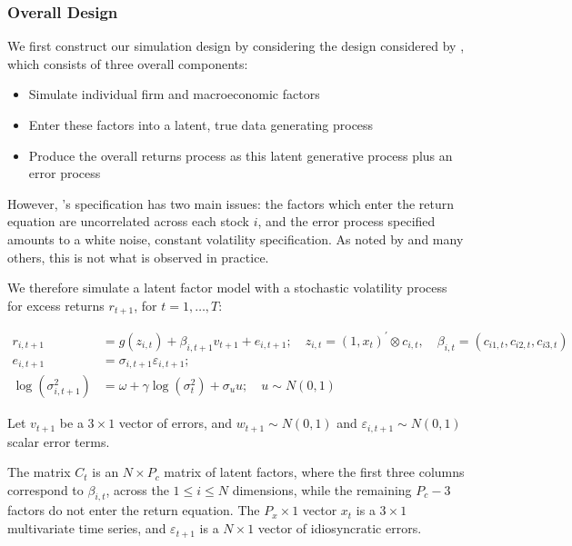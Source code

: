 \documentclass{article}
\begin{document}
\subsubsection{Overall Design}

We first construct our simulation design by considering the design considered by \cite{gu_empirical_2018}, which consists of three overall components:
\begin{itemize}
	\item Simulate individual firm and macroeconomic factors
	\item Enter these factors into a latent, true data generating process
	\item Produce the overall returns process as this latent generative process plus an error process
\end{itemize}

However, \cite{gu_empirical_2018}'s specification has two main issues: the factors which enter the return equation are uncorrelated across each stock $i$, and the error process specified amounts to a white noise, constant volatility specification. As noted by \cite{harvey__2016} and many others, this is not what is observed in practice. 

We therefore simulate a latent factor model with a stochastic volatility process for excess returns  $r_{t+1}$, for $t=1,\dots,T$:

\begin{align}
r_{i, t+1} &= 
g\left(z_{i, t}\right) + \beta_{i,t+1}v_{t+1} + e_{i, t+1}; 
\quad z_{i, t}=\left(1, x_{t}\right)^{\prime} \otimes c_{i, t}, 
\quad \beta_{i, t}=\left(c_{i 1, t}, c_{i 2, t}, c_{i 3, t}\right) \\ 
e_{i, t+1} &= 
\sigma_{i, t+1} \varepsilon_{i, t+1}; \\
\operatorname{log} (\sigma^2_{i,t+1}) &= 
\omega + \gamma \operatorname{log} (\sigma^2_{t}) + \sigma_{u}u; 
\quad u \sim N(0, 1)
\end{align}

Let $v_{t+1}$ be a $3\times 1$ vector of errors, and $w_{t+1} \sim N(0, 1)$ and $\varepsilon_{i,t+1} \sim N(0, 1)$ scalar error terms. 

The matrix $C_t$ is an $N\times P_c$ matrix of latent factors, where the first three columns correspond to $\beta_{i,t}$, across the $1\leq i\leq N$ dimensions, while the remaining $P_c-3$ factors do not enter the return equation. The $P_x\times1$ vector $x_t$ is a $3 \times 1$ multivariate time series, and $\varepsilon_{t+1}$ is a $N\times 1$ vector of idiosyncratic errors. 
\end{document}
